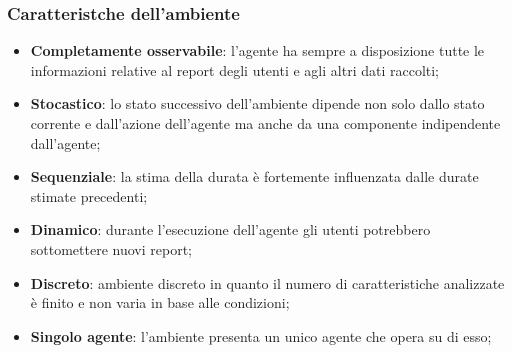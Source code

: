 \subsubsection{Caratteristche dell'ambiente}
\fancyhead{}    %
\par{
\begin{itemize}
    \item\textbf{Completamente osservabile}: l'agente ha sempre a disposizione tutte le informazioni relative al report degli utenti e agli altri dati raccolti;
    \item\textbf{Stocastico}: lo stato successivo dell’ambiente dipende non solo dallo stato corrente e dall’azione dell’agente ma anche da una componente indipendente dall’agente;
    \item\textbf{Sequenziale}: la stima della durata è fortemente influenzata dalle durate stimate precedenti;
    \item\textbf{Dinamico}: durante l'esecuzione dell'agente gli utenti potrebbero sottomettere nuovi report;
    \item\textbf{Discreto}: ambiente discreto in quanto il numero di caratteristiche analizzate è finito e non varia in base alle condizioni;
    \item\textbf{Singolo agente}: l'ambiente presenta un unico agente che opera su di esso;
\end{itemize}
}